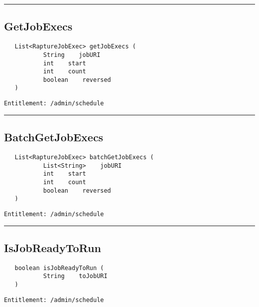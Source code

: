 \rule{12cm}{2pt}
\subsection{GetJobExecs}
\label{Api:GetJobExecs}
\begin{verbatim}
   List<RaptureJobExec> getJobExecs (
           String    jobURI
           int    start
           int    count
           boolean    reversed
   )
\end{verbatim}
\begin{Verbatim}[fontsize=\small, formatcom=\color{Maroon}]
  Entitlement: /admin/schedule
\end{Verbatim}



\rule{12cm}{2pt}
\subsection{BatchGetJobExecs}
\label{Api:BatchGetJobExecs}
\begin{verbatim}
   List<RaptureJobExec> batchGetJobExecs (
           List<String>    jobURI
           int    start
           int    count
           boolean    reversed
   )
\end{verbatim}
\begin{Verbatim}[fontsize=\small, formatcom=\color{Maroon}]
  Entitlement: /admin/schedule
\end{Verbatim}



\rule{12cm}{2pt}
\subsection{IsJobReadyToRun}
\label{Api:IsJobReadyToRun}
\begin{verbatim}
   boolean isJobReadyToRun (
           String    toJobURI
   )
\end{verbatim}
\begin{Verbatim}[fontsize=\small, formatcom=\color{Maroon}]
  Entitlement: /admin/schedule
\end{Verbatim}




